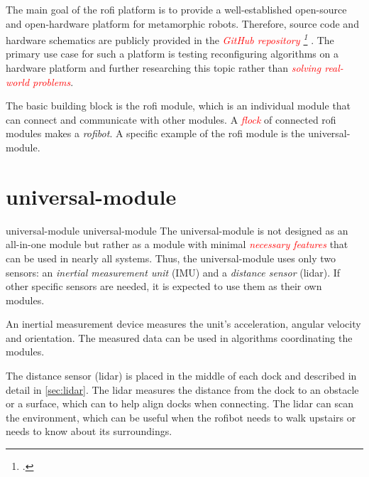 \documentclass[
  digital,     %
  oneside,     %
  nosansbold,  %
  nocolorbold, %
  nolof,         %
  nolot,         %
]{fithesis4}
\newcommand{\TODO}[1]{\textcolor{red}{\textit{#1}}}
\newcommand{\TODOLIST}[1]{}
\begin{document}
The main goal of the \acrshort{rofi} platform is to provide a well-established open-source and open-hardware platform for metamorphic robots. Therefore, source code and hardware schematics are publicly provided in the \TODO{ GitHub repository \footcite[\url{https://github.com/paradise-fi/RoFI}]{rofi-github} }. The primary use case for such a platform is testing reconfiguring algorithms on a hardware platform and further researching this topic rather than \TODO{solving real-world problems}.

The basic building block is the \acrshort{rofi} module, which is an individual module that can connect and communicate with other modules. A \TODO{flock} of connected \acrshort{rofi} modules makes a \emph{\gls{rofibot}}. A specific example of the \acrshort{rofi} module is the \gls{universal-module}.


\section[ Universal Module ]{ \gls{universal-module} }
\TODOLIST{
    \begin{itemize}
        \item ESP32
        \item \acrshort{spi}
        \item \acrshort{uart}
        \item accumulator
        \item EXT and INT power lines
        \item 3 motors
        \item 6 docks
    \end{itemize}
}
\gls{universal-module} \glsdesc{universal-module} The \gls{universal-module} is not designed as an all-in-one module but rather as a module with minimal \TODO{necessary features} that can be used in nearly all systems. Thus, the \gls{universal-module} uses only two sensors: an \emph{inertial measurement unit} (IMU) and a \emph{distance sensor} (\acrshort{lidar}). If other specific sensors are needed, it is expected to use them as their own modules.

An inertial measurement device measures the unit's acceleration, angular velocity and orientation. The measured data can be used in algorithms coordinating the modules.

The distance sensor (\acrshort{lidar}) is placed in the middle of each dock and described in detail in \autoref{sec:lidar}. The \acrshort{lidar} measures the distance from the dock to an obstacle or a surface, which can to help align docks when connecting. The \acrshort{lidar} can scan the environment, which can be useful when the \gls{rofibot} needs to walk upstairs or needs to know about its surroundings.
\end{document}
